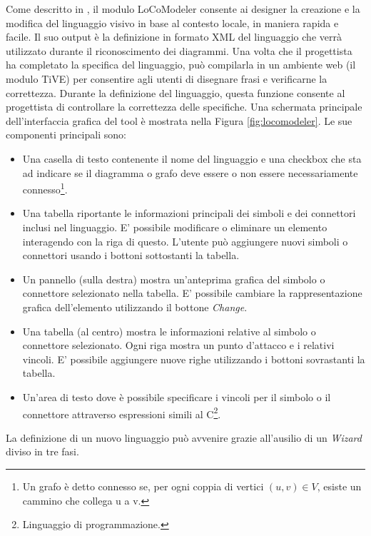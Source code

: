             Come descritto in \cite{extending_localcontext}, il modulo LoCoModeler consente ai designer la creazione e la modifica del linguaggio visivo in base al contesto locale, in maniera rapida e facile. Il suo output è la definizione in formato XML del linguaggio che verrà utilizzato durante il riconoscimento dei diagrammi. Una volta che il progettista ha completato la specifica del linguaggio, può compilarla in un ambiente web (il modulo TiVE) per consentire agli utenti di disegnare frasi e verificarne la correttezza. Durante la definizione del linguaggio, questa funzione consente al progettista di controllare la correttezza delle specifiche.
            \newline
            Una schermata principale dell'interfaccia grafica del tool è mostrata nella Figura \ref{fig:locomodeler}. Le sue componenti principali sono:
            \begin{itemize}
                \item Una casella di testo contenente il nome del linguaggio e una checkbox che sta ad indicare se il diagramma o grafo deve essere o non essere necessariamente connesso\footnote{Un grafo è detto connesso se, per ogni coppia di vertici $(u, v)\in{V}$, esiste un cammino che collega u a v.}.
                \item Una tabella riportante le informazioni principali dei simboli e dei connettori inclusi nel linguaggio. E' possibile modificare o eliminare un elemento interagendo con la riga di questo. L'utente può aggiungere nuovi simboli o connettori usando i bottoni sottostanti la tabella.
                \item Un pannello (sulla destra) mostra un'anteprima grafica del simbolo o connettore selezionato nella tabella. E' possibile cambiare la rappresentazione grafica dell'elemento utilizzando il bottone \textit{Change}.
                \item Una tabella (al centro) mostra le informazioni relative al simbolo o connettore selezionato. Ogni riga mostra un punto d'attacco e i relativi vincoli. E' possibile aggiungere nuove righe utilizzando i bottoni sovrastanti la tabella.
                \item Un'area di testo dove è possibile specificare i vincoli per il simbolo o il connettore attraverso espressioni simili al C\footnote{Linguaggio di programmazione.}.
            \end{itemize}
            La definizione di un nuovo linguaggio può avvenire grazie all'ausilio di un \textit{Wizard} diviso in tre fasi.

